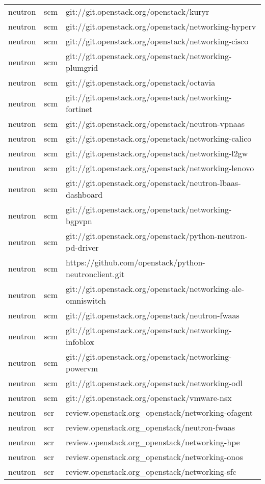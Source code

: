 \begin{center}
\begin{longtable}{|p{4cm}|p{1cm}|p{10cm}|}
neutron&scm&git://git.openstack.org/openstack/kuryr\\ 
neutron&scm&git://git.openstack.org/openstack/networking-hyperv\\ 
neutron&scm&git://git.openstack.org/openstack/networking-cisco\\ 
neutron&scm&git://git.openstack.org/openstack/networking-plumgrid\\ 
neutron&scm&git://git.openstack.org/openstack/octavia\\ 
neutron&scm&git://git.openstack.org/openstack/networking-fortinet\\ 
neutron&scm&git://git.openstack.org/openstack/neutron-vpnaas\\ 
neutron&scm&git://git.openstack.org/openstack/networking-calico\\ 
neutron&scm&git://git.openstack.org/openstack/networking-l2gw\\ 
neutron&scm&git://git.openstack.org/openstack/networking-lenovo\\ 
neutron&scm&git://git.openstack.org/openstack/neutron-lbaas-dashboard\\ 
neutron&scm&git://git.openstack.org/openstack/networking-bgpvpn\\ 
neutron&scm&git://git.openstack.org/openstack/python-neutron-pd-driver\\ 
neutron&scm&https://github.com/openstack/python-neutronclient.git\\ 
neutron&scm&git://git.openstack.org/openstack/networking-ale-omniswitch\\ 
neutron&scm&git://git.openstack.org/openstack/neutron-fwaas\\ 
neutron&scm&git://git.openstack.org/openstack/networking-infoblox\\ 
neutron&scm&git://git.openstack.org/openstack/networking-powervm\\ 
neutron&scm&git://git.openstack.org/openstack/networking-odl\\ 
neutron&scm&git://git.openstack.org/openstack/vmware-nsx\\ 
neutron&scr&review.openstack.org\_openstack/networking-ofagent\\ 
neutron&scr&review.openstack.org\_openstack/neutron-fwaas\\ 
neutron&scr&review.openstack.org\_openstack/networking-hpe\\ 
neutron&scr&review.openstack.org\_openstack/networking-onos\\ 
neutron&scr&review.openstack.org\_openstack/networking-sfc\\ 

\end{longtable}
\end{center}

